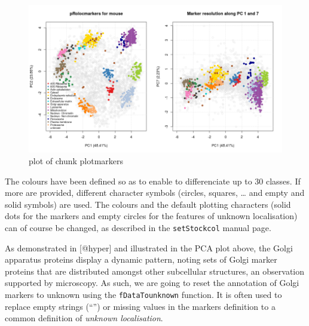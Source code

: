 \begin{Shaded}
\begin{Highlighting}[]
\NormalTok{(} \NormalTok{(}\NormalTok{, }\NormalTok{))}
 \NormalTok{)}
 \NormalTok{)}
 \NormalTok{(}\NormalTok{, }\NormalTok{), } \NormalTok{)}
\end{Highlighting}
\end{Shaded}

\begin{figure}[htbp]
\centering
\includegraphics{figure/plotmarkers-1.png}
\caption{plot of chunk plotmarkers}
\end{figure}

The colours have been defined so as to enable to differenciate up to 30
classes. If more are provided, different character symbols (circles,
squares, \ldots{} and empty and solid symbols) are used. The colours and
the default plotting characters (solid dots for the markers and empty
circles for the features of unknown localisation) can of course be
changed, as described in the \texttt{setStockcol} manual page.

As demonstrated in {[}@hyper{]} and illustrated in the PCA plot above,
the Golgi apparatus proteins display a dynamic pattern, noting sets of
Golgi marker proteins that are distributed amongst other subcellular
structures, an observation supported by microscopy. As such, we are
going to reset the annotation of Golgi markers to unknown using the
\texttt{fDataTounknown} function. It is often used to replace empty
strings (``'') or missing values in the markers definition to a common
definition of \emph{unknown localisation}.

